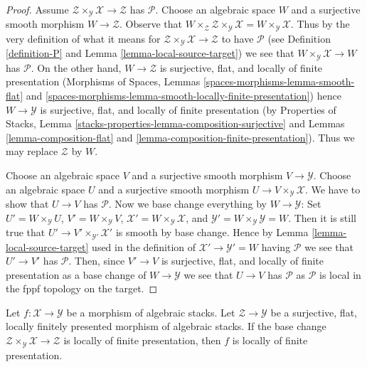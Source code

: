 \begin{proof}
Assume $\mathcal{Z} \times_\mathcal{Y} \mathcal{X} \to \mathcal{Z}$
has $\mathcal{P}$. Choose an algebraic space $W$ and a surjective
smooth morphism $W \to \mathcal{Z}$. Observe that
$W \times_\mathcal{Z} \mathcal{Z} \times_\mathcal{Y} \mathcal{X} =
W \times_\mathcal{Y} \mathcal{X}$. Thus by the very definition of
what it means for $\mathcal{Z} \times_\mathcal{Y} \mathcal{X} \to \mathcal{Z}$
to have $\mathcal{P}$ (see Definition \ref{definition-P}
and Lemma \ref{lemma-local-source-target})
we see that $W \times_\mathcal{Y} \mathcal{X} \to W$
has $\mathcal{P}$. On the other hand, $W \to \mathcal{Z}$
is surjective, flat, and locally of finite presentation
(Morphisms of Spaces, Lemmas
\ref{spaces-morphisms-lemma-smooth-flat} and
\ref{spaces-morphisms-lemma-smooth-locally-finite-presentation})
hence $W \to \mathcal{Y}$ is surjective, flat, and locally of finite
presentation (by
Properties of Stacks, Lemma
\ref{stacks-properties-lemma-composition-surjective}
and
Lemmas \ref{lemma-composition-flat} and
\ref{lemma-composition-finite-presentation}).
Thus we may replace $\mathcal{Z}$ by $W$.

\medskip\noindent
Choose an algebraic space $V$ and a surjective smooth morphism
$V \to \mathcal{Y}$. Choose an algebraic space $U$ and a surjective
smooth morphism $U \to V \times_\mathcal{Y} \mathcal{X}$.
We have to show that $U \to V$ has $\mathcal{P}$.
Now we base change everything by $W \to \mathcal{Y}$: Set
$U' = W \times_\mathcal{Y} U$,
$V' = W \times_\mathcal{Y} V$,
$\mathcal{X}' = W \times_\mathcal{Y} \mathcal{X}$,
and $\mathcal{Y}' = W \times_\mathcal{Y} \mathcal{Y} = W$.
Then it is still true that $U' \to V' \times_{\mathcal{Y}'} \mathcal{X}'$
is smooth by base change. Hence by Lemma \ref{lemma-local-source-target}
used in the definition of $\mathcal{X}' \to \mathcal{Y}' = W$
having $\mathcal{P}$ we see that $U' \to V'$ has $\mathcal{P}$.
Then, since $V' \to V$ is surjective, flat, and locally of finite presentation
as a base change of $W \to \mathcal{Y}$ we see that $U \to V$
has $\mathcal{P}$ as $\mathcal{P}$ is local in the fppf topology
on the target.
\end{proof}

\begin{lemma}
\label{lemma-descent-finite-presentation}
Let $f : \mathcal{X} \to \mathcal{Y}$ be a morphism of algebraic stacks.
Let $\mathcal{Z} \to \mathcal{Y}$ be a surjective, flat, locally finitely
presented morphism of algebraic stacks. If the base change
$\mathcal{Z} \times_\mathcal{Y} \mathcal{X} \to \mathcal{Z}$
is locally of finite presentation, then $f$ is locally of finite
presentation.
\end{lemma}

